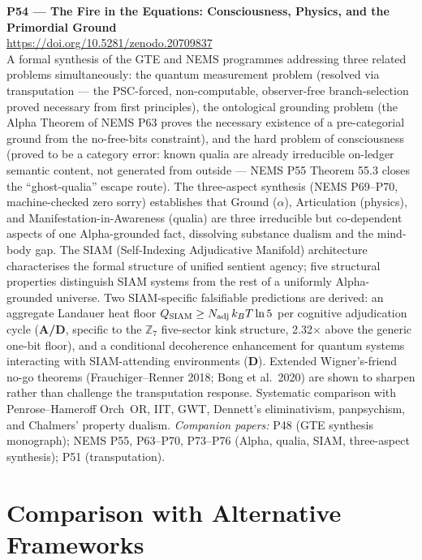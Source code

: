 \documentclass[11pt]{article}
\newcommand{\CatAD}{\textbf{A/D}}
\newcommand{\CatD}{\textbf{D}}
\begin{document}
\medskip
\noindent\textbf{P54 --- The Fire in the Equations: Consciousness, Physics, and the Primordial Ground}~\cite{SpivackFireInTheEquations}\\
\url{https://doi.org/10.5281/zenodo.20709837}\\
A formal synthesis of the GTE and NEMS programmes addressing three related
problems simultaneously: the quantum measurement problem (resolved via
transputation --- the PSC-forced, non-computable, observer-free branch-selection
proved necessary from first principles), the ontological grounding problem (the
Alpha Theorem of NEMS P63 proves the necessary existence of a pre-categorial ground
from the no-free-bits constraint), and the hard problem of consciousness (proved
to be a category error: known qualia are already irreducible on-ledger semantic
content, not generated from outside --- NEMS P55 Theorem 55.3 closes the
``ghost-qualia'' escape route). The three-aspect synthesis (NEMS P69--P70, machine-checked
zero sorry) establishes that Ground ($\alpha$), Articulation (physics), and
Manifestation-in-Awareness (qualia) are three irreducible but co-dependent aspects
of one Alpha-grounded fact, dissolving substance dualism and the mind-body gap.
The SIAM (Self-Indexing Adjudicative Manifold) architecture characterises the
formal structure of unified sentient agency; five structural properties distinguish
SIAM systems from the rest of a uniformly Alpha-grounded universe. Two SIAM-specific
falsifiable predictions are derived: an aggregate Landauer heat floor
$Q_{\rm SIAM} \geq N_{\rm adj}\,k_B T \ln 5$ per cognitive adjudication cycle
(\CatAD, specific to the $\mathbb{Z}_7$ five-sector kink structure, 2.32$\times$
above the generic one-bit floor), and a conditional decoherence enhancement for
quantum systems interacting with SIAM-attending environments (\CatD). Extended
Wigner's-friend no-go theorems (Frauchiger--Renner 2018; Bong et al.\ 2020) are
shown to sharpen rather than challenge the transputation response. Systematic
comparison with Penrose--Hameroff Orch~OR, IIT, GWT, Dennett's eliminativism,
panpsychism, and Chalmers' property dualism.
\emph{Companion papers:} P48 (GTE synthesis monograph); NEMS P55, P63--P70, P73--P76
(Alpha, qualia, SIAM, three-aspect synthesis); P51 (transputation).

\section{Comparison with Alternative Frameworks}
\label{sec:comparison}
\end{document}
